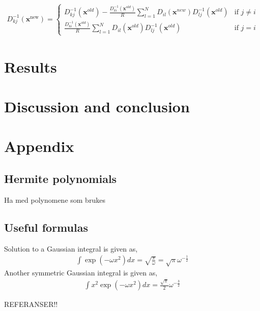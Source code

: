 \documentclass[11pt]{article}
\newcommand{\husk}[1]{\color{red} #1 \color{black}}
\begin{document}
\begin{align}
D_{kj}^{-1}(\mathbf{x}^\text{new}) = \left\{
\begin{array}{ll}
	D_{kj}^{-1}(\mathbf{x}^{old}) - \frac{D_{ki}^{-1}(\mathbf{x}^{old})}{R}\sum^N_{l=1} D_{il}(\mathbf{x}^{new})D^{-1}_{lj}(\mathbf{x}^{old}) & \text{if } j\neq i \\
	\frac{D_{ki}^{-1}(\mathbf{x}^{old})}{R}\sum^N_{l=1} D_{il}(\mathbf{x}^{old})D^{-1}_{lj}(\mathbf{x}^{old}) & \text{if } j = i
\end{array}
\right.
\end{align}


\section{Results}



\section{Discussion and conclusion}



\section{Appendix}
\subsection{Hermite polynomials}
\husk{Ha med polynomene som brukes}

\subsection{Useful formulas}
Solution to a Gaussian integral is given as,
\begin{align}
	\int \exp\left( - \omega x^2 \right) d x = \sqrt{\frac{\pi}{\omega}} = \sqrt{\pi}\omega^{-\frac{1}{2}}
	\label{eq:gaussian-integral}
\end{align}
Another symmetric Gaussian integral is given as,
\begin{align}
	\int x^2 \exp\left( - \omega x^2 \right) d x = \frac{\sqrt{\pi}}{2}\omega^{-\frac{3}{2}}
	\label{eq:gaussian-integral-x-squared}
\end{align}

\husk{REFERANSER!!}
\end{document}
